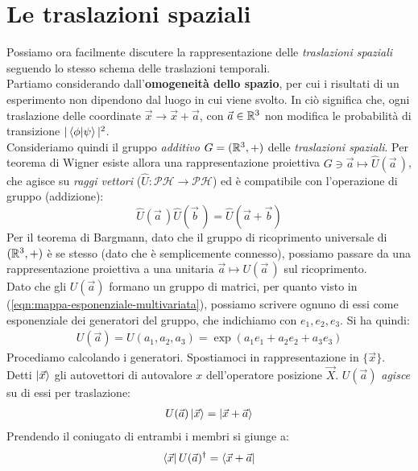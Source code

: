 \documentclass[../../FisicaTeorica.tex]{subfiles}
\begin{document}
\section{Le traslazioni spaziali}
Possiamo ora facilmente discutere la rappresentazione delle \textit{traslazioni spaziali} seguendo lo stesso schema delle traslazioni temporali.\\
Partiamo considerando dall'\textbf{omogeneità dello spazio}, per cui i risultati di un esperimento non dipendono dal luogo in cui viene svolto. In \MQ ciò significa che, ogni traslazione delle coordinate $\vec{x} \to \vec{x}+\vec{a}$, con $\vec{a}\in \mathbb{R}^3$ non modifica le probabilità di transizione $|\braket{\phi|\psi}|^2$.\\
Consideriamo quindi il gruppo \textit{additivo} $G=(\mathbb{R}^3, +)$ delle \textit{traslazioni spaziali}. 
Per teorema di Wigner esiste allora una rappresentazione proiettiva $G\ni \vec{a} \mapsto \hat{U}(\vec{a}\,)$, che agisce su \textit{raggi vettori} ($\hat{U}:\mathcal{PH}\to\mathcal{PH}$) ed è compatibile con l'operazione di gruppo (addizione):
\begin{equation}
\hat{U}(\vec{a}\,)\hat{U}(\vec{b}\,)=\hat{U}(\vec{a}+\vec{b})
\label{eqn:translation-group-property}
\end{equation}
Per il teorema di Bargmann, dato che il gruppo di ricoprimento universale di $(\mathbb{R}^3,+)$ è se stesso (dato che è semplicemente connesso), possiamo passare da una rappresentazione proiettiva a una unitaria $\vec{a} \mapsto U(\vec{a}\,)$ sul ricoprimento.\\
Dato che gli $U(\vec{a})$ formano un gruppo di matrici, per quanto visto in (\ref{eqn:mappa-esponenziale-multivariata}), possiamo scrivere ognuno di essi come esponenziale dei generatori del gruppo, che indichiamo con $e_1, e_2, e_3$. Si ha quindi:
\begin{align}
U(\vec{a}) = U(a_1, a_2, a_3) = \exp(a_1 e_1 + a_2 e_2 + a_3e_3)
\label{eqn:traslazione-spaziale}
\end{align}
Procediamo calcolando i generatori. Spostiamoci in rappresentazione in $\{\vec{x}\}$. Detti $\ket{\vec{x}}$ gli autovettori di autovalore $x$ dell'operatore posizione $\vec{X}$. $U(\vec{a})$ \textit{agisce} su di essi per traslazione:
\begin{align*}
U(\vec{a}) \ket{\vec{x}} = \ket{\vec{x}+\vec{a}}
\end{align*}
Prendendo il coniugato di entrambi i membri si giunge a:
\begin{align}
\bra{\vec{x}} U(\vec{a})^\dag =\bra{\vec{x}+\vec{a}}
\label{eqn:bra-applicated}
\end{align}
\end{document}

